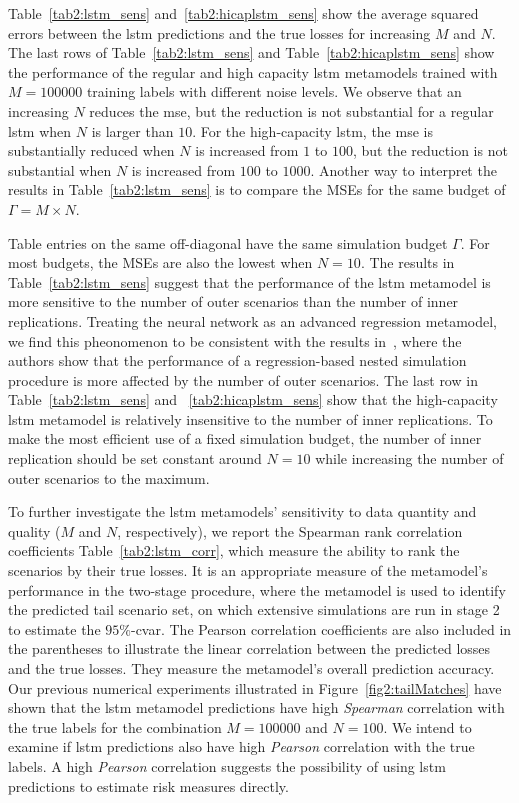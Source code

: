 Table~\ref{tab2:lstm_sens} and~\ref{tab2:hicaplstm_sens} show the average squared errors between the \gls{lstm} predictions and the true losses for increasing $M$ and $N$.
The last rows of Table~\ref{tab2:lstm_sens} and Table~\ref{tab2:hicaplstm_sens} show the performance of the regular and high capacity \gls{lstm} metamodels trained with $M=\num{100000}$ training labels with different noise levels.
We observe that an increasing $N$ reduces the \gls{mse}, but the reduction is not substantial for a regular \gls{lstm} when $N$ is larger than $\num{10}$.
For the high-capacity \gls{lstm}, the \gls{mse} is substantially reduced when $N$ is increased from $\num{1}$ to $\num{100}$, but the reduction is not substantial when $N$ is increased from $\num{100}$ to $\num{1000}$.
Another way to interpret the results in Table~\ref{tab2:lstm_sens} is to compare the MSEs for the same budget of $\Gamma = M \times N$. 

Table entries on the same off-diagonal have the same simulation budget $\Gamma$.
For most budgets, the MSEs are also the lowest when $N = 10$.
The results in Table~\ref{tab2:lstm_sens} suggest that the performance of the \gls{lstm} metamodel is more sensitive to the number of outer scenarios than the number of inner replications.
Treating the neural network as an advanced regression metamodel, we find this pheonomenon to be consistent with the results in~\cite{broadie2015risk}, where the authors show that the performance of a regression-based nested simulation procedure is more affected by the number of outer scenarios.
The last row in Table~\ref{tab2:lstm_sens} and ~\ref{tab2:hicaplstm_sens} show that the high-capacity \gls{lstm} metamodel is relatively insensitive to the number of inner replications.
To make the most efficient use of a fixed simulation budget, the number of inner replication should be set constant around $N=10$ while increasing the number of outer scenarios to the maximum.

To further investigate the \gls{lstm} metamodels' sensitivity to data quantity and quality ($M$ and $N$, respectively), we report the Spearman rank correlation coefficients Table~\ref{tab2:lstm_corr}, which measure the ability to rank the scenarios by their true losses.
It is an appropriate measure of the metamodel's performance in the two-stage procedure, where the metamodel is used to identify the predicted tail scenario set, on which extensive simulations are run in stage 2 to estimate the $95\%$-\gls{cvar}.
The Pearson correlation coefficients are also included in the parentheses to illustrate the linear correlation between the predicted losses and the true losses.
They measure the metamodel's overall prediction accuracy.
Our previous numerical experiments illustrated in Figure~\ref{fig2:tailMatches} have shown that the \gls{lstm} metamodel predictions have high \textit{Spearman} correlation with the true labels for the combination $M=\num{100000}$ and $N=\num{100}$.
We intend to examine if \gls{lstm} predictions also have high \textit{Pearson} correlation with the true labels.
A high \textit{Pearson} correlation suggests the possibility of using \gls{lstm} predictions to estimate risk measures directly.

